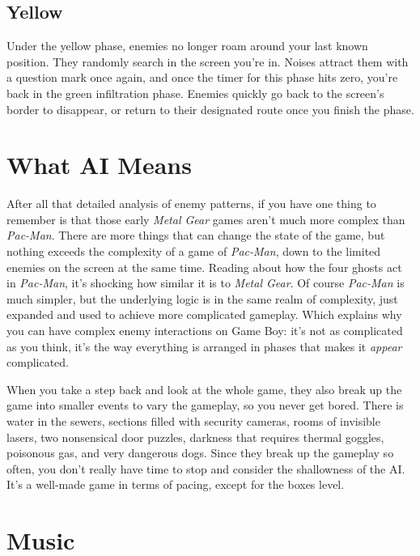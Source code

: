 \documentclass{book}
\begin{document}
\subsection*{Yellow}\nopagebreak[4]

Under the yellow phase, enemies no longer roam around your last known position. They randomly search in the screen you’re in. Noises attract them with a question mark once again, and once the timer for this phase hits zero, you’re back in the green infiltration phase. Enemies quickly go back to the screen’s border to disappear, or return to their designated route once you finish the phase.

\FloatBarrier\needspace{10mm}\section*{What AI Means}\nopagebreak[4]

After all that detailed analysis of enemy patterns, if you have one thing to remember is that those early \emph{Metal Gear} games aren’t much more complex than \emph{Pac-Man}. There are more things that can change the state of the game, but nothing exceeds the complexity of a game of \emph{Pac-Man}, down to the limited enemies on the screen at the same time. Reading about how the four ghosts act in \emph{Pac-Man}, it’s shocking how similar it is to \emph{Metal Gear}. Of course \emph{Pac-Man} is much simpler, but the underlying logic is in the same realm of complexity, just expanded and used to achieve more complicated gameplay. Which explains why you can have complex enemy interactions on Game Boy: it’s not as complicated as you think, it’s the way everything is arranged in phases that makes it \emph{appear} complicated.

When you take a step back and look at the whole game, they also break up the game into smaller events to vary the gameplay, so you never get bored. There is water in the sewers, sections filled with security cameras, rooms of invisible lasers, two nonsensical door puzzles, darkness that requires thermal goggles, poisonous gas, and very dangerous dogs. Since they break up the gameplay so often, you don’t really have time to stop and consider the shallowness of the AI. It’s a well-made game in terms of pacing, except for the boxes level.

\FloatBarrier\needspace{10mm}\section*{Music}\nopagebreak[4]
\end{document}
